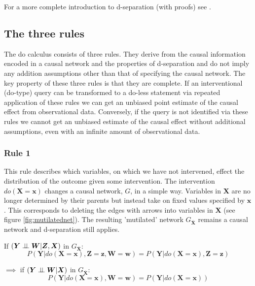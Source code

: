 \documentclass[11pt,a4paper]{article}
\begin{document}
For a more complete introduction to d-separation (with proofs) see \cite{Koller2009}.

\subsection{The three rules}
The do calculus consists of three rules. They derive from the causal information encoded in a causal network and the properties of d-separation and do not imply any addition assumptions other than that of specifying the causal network. The key property of these three rules is that they are complete. If an interventional (do-type) query can be transformed to a do-less statement via repeated application of these rules we can get an unbiased point estimate of the causal effect from observational data. Conversely, if the query is not identified via these rules we cannot get an unbiased estimate of the causal effect without additional assumptions, even with an infinite amount of observational data. 

\subsubsection{Rule 1}
This rule describes which variables, on which we have not intervened, effect the distribution of the outcome given some intervention. The intervention $do(\boldsymbol{X}=\boldsymbol{x})$ changes a causal network, $G$, in a simple way. Variables in $\boldsymbol{X}$ are no longer determined by their parents but instead take on fixed values specified by $\boldsymbol{x}$. This corresponds to deleting the edges with arrows into variables in $\boldsymbol{X}$  (see figure \ref{fig:mutilatednet}). The resulting 'mutilated' network $G_{\overline{\boldsymbol{X}}}$ remains a causal network and d-separation still applies. 

If $(\boldsymbol{Y} \perp\!\!\!\perp \boldsymbol{W} | \boldsymbol{Z},\boldsymbol{X})$ in $G_{\overline{\boldsymbol{X}}}$:
\begin{equation}
\label{eq:Do1}
 P(\boldsymbol{Y}|do(\boldsymbol{X}=\boldsymbol{x}),\boldsymbol{Z}=\boldsymbol{z},\boldsymbol{W}=\boldsymbol{w}) = P(\boldsymbol{Y}|do(\boldsymbol{X}=\boldsymbol{x}),\boldsymbol{Z}=\boldsymbol{z}) 
\end{equation}

$\implies$ if $(\boldsymbol{Y} \perp\!\!\!\perp \boldsymbol{W} | \boldsymbol{X})$ in $G_{\overline{\boldsymbol{X}}}$:
\begin{equation}
\label{eq:Do12}
 P(\boldsymbol{Y}|do(\boldsymbol{X}=\boldsymbol{x}),\boldsymbol{W}=\boldsymbol{w}) = P(\boldsymbol{Y}|do(\boldsymbol{X}=\boldsymbol{x})) 
\end{equation}
\end{document}
